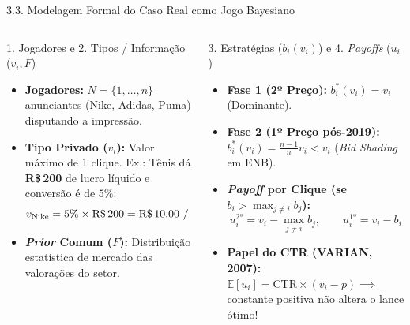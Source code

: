 \documentclass[aspectratio=169, 10pt]{beamer}
\newcommand{\defbox}[2]{%
  \begin{block}{#1}
    \footnotesize\setlength{\abovedisplayskip}{4pt}\setlength{\belowdisplayskip}{4pt}
    #2\par
  \end{block}%
}
\begin{document}
\begin{frame}{3.3. Modelagem Formal do Caso Real como Jogo Bayesiano}
  \begin{columns}[T, onlytextwidth]
    \begin{column}{0.49\textwidth}
      \defbox{1. Jogadores e 2. Tipos / Informação ($v_i, F$)}{%
      \begin{itemize}\setlength{\itemsep}{3pt}
          \item \textbf{Jogadores:} $N = \{1, \dots, n\}$ anunciantes
            (Nike, Adidas, Puma) disputando a impressão.
          \item \textbf{Tipo Privado ($v_i$):} Valor máximo de 1
            clique. Ex.: Tênis dá \textbf{R\$\,200} de lucro líquido
            e conversão é de $5\%$:
            \[
              v_{\text{Nike}} = 5\% \times \text{R\$\,200} =
              \mathbf{\text{R\$\,10,00 / clique}}
            \]
          \item \textbf{\textit{Prior} Comum ($F$):} Distribuição
            estatística de mercado das valorações do setor.
        \end{itemize}
      }
    \end{column}
    \begin{column}{0.49\textwidth}
      \defbox{3. Estratégias ($b_i(v_i)$) e 4. \textit{Payoffs} ($u_i$)}{%
      \begin{itemize}\setlength{\itemsep}{3pt}
          \item \textbf{Fase 1 (2º Preço):} $b_i^\ast(v_i) = v_i$ (Dominante).
          \item \textbf{Fase 2 (1º Preço pós-2019):} $b_i^\ast(v_i) =
            \frac{n-1}{n}v_i < v_i$ (\textit{Bid Shading} em ENB).
          \item \textbf{\textit{Payoff} por Clique (se $b_i > \max_{j
            \neq i} b_j$):}
            \[
              u_i^{\text{2º}} = v_i - \max_{j \neq i} b_j, \qquad
              u_i^{\text{1º}} = v_i - b_i
            \]
          \item \textbf{Papel do CTR (VARIAN, 2007):}
            $\mathbb{E}[u_i] = \text{CTR} \times (v_i - p) \implies$
            constante positiva não altera o lance ótimo!
        \end{itemize}
      }
    \end{column}
  \end{columns}
\end{frame}
\end{document}
